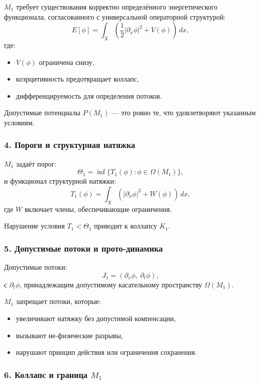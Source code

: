 $M_1$ требует существования корректно определённого энергетического функционала,
согласованного с универсальной операторной структурой:
\[
E[\phi] = \int_X \left(
\frac{1}{2} |\partial_x \phi|^2 + V(\phi)
\right)\,dx,
\]
где:

\begin{itemize}
    \item $V(\phi)$ ограничена снизу,
    \item коэрцитивность предотвращает коллапс,
    \item дифференцируемость для определения потоков.
\end{itemize}

Допустимые потенциалы $P(M_1)$ — это ровно те, что удовлетворяют указанным
условиям.

\subsubsection*{4. Пороги и структурная натяжка}

$M_1$ задаёт порог:
\[
\Theta_1 = \inf \{ T_1(\phi) : \phi \in \Omega(M_1) \},
\]
и функционал структурной натяжки:
\[
T_1(\phi) =
\int_X \left(
|\partial_x \phi|^2 + W(\phi)
\right)\, dx,
\]
где $W$ включает члены, обеспечивающие ограничения.

Нарушение условия $T_1 < \Theta_1$ приводит к коллапсу $K_1$.

\subsubsection*{5. Допустимые потоки и прото-динамика}

Допустимые потоки:
\[
J_1 = (\partial_x \phi,\ \partial_t \phi),
\]
с $\partial_t\phi$, принадлежащим допустимому касательному пространству
$\Omega(M_1)$.

$M_1$ запрещает потоки, которые:
\begin{itemize}
    \item увеличивают натяжку без допустимой компенсации,
    \item вызывают не-физические разрывы,
    \item нарушают принцип действия или ограничения сохранения.
\end{itemize}

\subsubsection*{6. Коллапс и граница \texorpdfstring{$M_1$}{M_1}}

